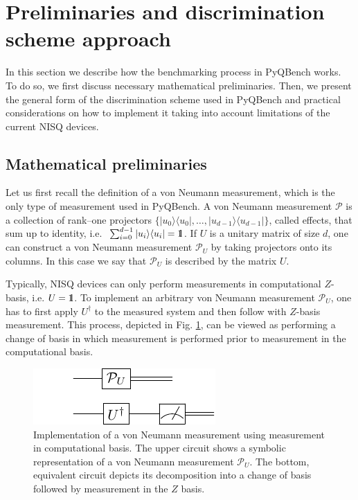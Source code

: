 \documentclass[preprint,12pt, a4paper, dvipsnames]{elsarticle}
\newcommand{\ket}[1]{\ensuremath{|#1\rangle}}
\newcommand{\bra}[1]{\ensuremath{\langle#1|}}
\newcommand{\ketbra}[2]{\ensuremath{\ket{#1}\bra{#2}}}
\newcommand{\proj}[1]{\ensuremath{\ketbra{#1}{#1}}}
\newcommand{\1}{{\rm 1\hspace{-0.9mm}l}}
\newcommand{\PP}{\mathcal{P}}
\theoremstyle{definition}
\begin{document}

\section{Preliminaries and discrimination scheme approach}

In this section we describe how the benchmarking process in PyQBench works. To do so, we first
discuss necessary mathematical preliminaries. Then, we present the general form of the
discrimination scheme used in PyQBench and practical considerations on how to implement it taking
into account limitations of the current NISQ devices.

\subsection{Mathematical preliminaries}\label{sec:maths}

Let us first recall the definition of a von Neumann measurement, which is the only type of
measurement used in PyQBench. A von Neumann measurement $\PP$ is a collection of rank--one projectors
$\{\proj{u_0}, \ldots, \proj{u_{d-1}}\}$, called effects, that sum up to identity,
i.e. $ \, \, \sum_{i=0}^{d-1} \proj{u_i} = \1$. If $U$ is a unitary matrix of size $d$,
one can construct a von Neumann measurement $\PP_{U}$ by taking projectors onto its columns. In this
case we say that $\PP_{U}$ is described by the matrix $U$.

Typically, NISQ devices can only perform measurements in computational $Z$-basis, i.e. $U=\1$.
To implement an arbitrary von Neumann measurement $\PP_{U}$, one has to first apply $U^\dagger$
to the measured system and then follow with $Z$-basis measurement. This process, depicted in Fig.
\ref{fig:vonneumann}, can be viewed as performing a change of basis in which measurement is
performed prior to measurement in the computational basis.

\begin{figure}[h!]
	\centering
	\includegraphics[scale=1.7]{pics/vonneuman}
	\caption{Implementation of a von Neumann measurement using measurement in computational basis.
	The upper circuit shows a symbolic representation of a von Neumann measurement $\PP_{U}$. The
	bottom, equivalent circuit depicts its decomposition into a change of basis followed
	by measurement in the $Z$ basis.}
	\label{fig:vonneumann}
\end{figure}
\end{document}

